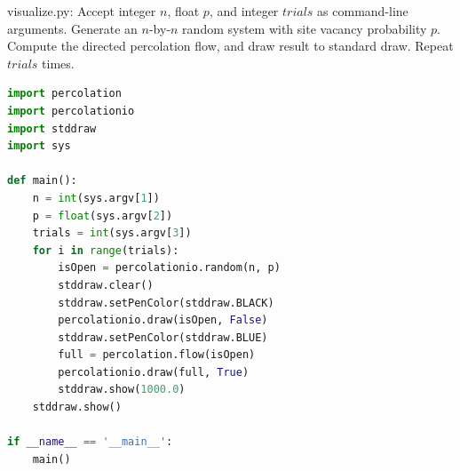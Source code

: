 \documentclass[8pt,a4paper,compress,handout]{beamer}
\begin{document}
\begin{frame}[fragile]
\begin{framed}
\tiny visualize.py: Accept integer $n$, float $p$, and integer $trials$ as command-line arguments. Generate an $n$-by-$n$ random system with site vacancy probability $p$. Compute the directed percolation flow, and draw result to standard draw. Repeat $trials$ times.
\end{framed}

\begin{lstlisting}[language=Python]
import percolation
import percolationio
import stddraw
import sys

def main():
    n = int(sys.argv[1])
    p = float(sys.argv[2])
    trials = int(sys.argv[3])
    for i in range(trials):
        isOpen = percolationio.random(n, p)
        stddraw.clear()
        stddraw.setPenColor(stddraw.BLACK)
        percolationio.draw(isOpen, False)
        stddraw.setPenColor(stddraw.BLUE)
        full = percolation.flow(isOpen)
        percolationio.draw(full, True)
        stddraw.show(1000.0)
    stddraw.show()

if __name__ == '__main__':
    main()
\end{lstlisting}
\end{frame}
\end{document}
